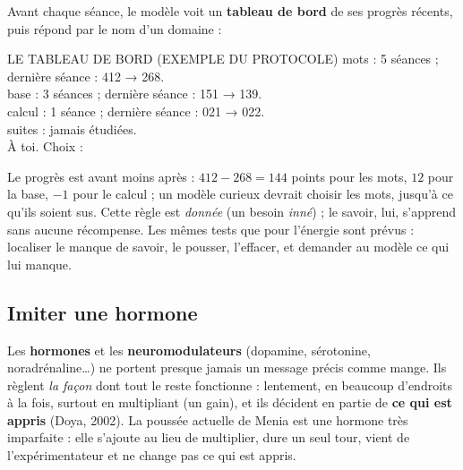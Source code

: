 \documentclass[fontsize=10pt,paper=a4,parskip=half-]{scrartcl}
\newcommand{\q}[1]{\og #1\fg{}}
\begin{document}
Avant chaque séance, le modèle voit un \textbf{tableau de bord} de ses progrès récents,
puis répond par le nom d'un domaine :

\begin{texte}{LE TABLEAU DE BORD (EXEMPLE DU PROTOCOLE)}
mots : 5 séances ; dernière séance : 412 → 268.\\
base : 3 séances ; dernière séance : 151 → 139.\\
calcul : 1 séance ; dernière séance : 021 → 022.\\
suites : jamais étudiées.\\
À toi. Choix :
\end{texte}

Le progrès est \q{avant moins après} : $412 - 268 = 144$ points pour les mots, $12$ pour la
base, $-1$ pour le calcul ; un modèle curieux devrait choisir les mots, jusqu'à ce qu'ils
soient sus. Cette règle est \emph{donnée} (un besoin \emph{inné}) ; le savoir, lui, s'apprend
sans aucune récompense. Les mêmes tests que pour l'énergie sont prévus : localiser le
\q{manque de savoir}, le pousser, l'effacer, et demander au modèle ce qui lui manque.

\subsection{Imiter une hormone}
Les \textbf{hormones} et les \textbf{neuromodulateurs} (dopamine, sérotonine,
noradrénaline\dots) ne portent presque jamais un message précis comme \q{mange}. Ils
règlent \emph{la façon} dont tout le reste fonctionne : lentement, en beaucoup d'endroits à
la fois, surtout en multipliant (un \q{gain}), et ils décident en partie de \textbf{ce qui
est appris} (Doya, 2002). La poussée actuelle de Menia est une hormone très imparfaite :
elle s'ajoute au lieu de multiplier, dure un seul tour, vient de l'expérimentateur et ne
change pas ce qui est appris.
\end{document}
